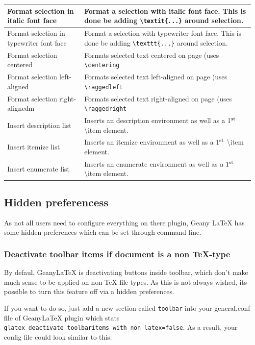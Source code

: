 \documentclass[%
a4paper,%
10pt,%
oneside,%
DIV18,
headsepline,
plainheadsepline,
footsepline,
plainfootsepline,
bibtotoc,%
liststotoc,%
BCOR12mm,%
halfparskip,%
openany,%
]{scrartcl}
\newcommand{\up}[1]{\ensuremath{^\textrm{\scriptsize#1}}}
\begin{document}
\begin{table}[H]
\begin{tabular}{l|p{9cm}}
Format selection in italic font face & Format a selection with italic font face.
This is done be adding \texttt{\textbackslash textit\{...\}} around selection.\\\hline
Format selection in typewriter font face & Format a selection with typewriter
font face. This is done be adding \texttt{\textbackslash texttt\{...\}} around
selection.\\\hline
Format selection centered & Formats selected text centered on page (uses \texttt{\textbackslash{}centering} \\\hline
Format selection left-aligned & Formats selected text left-aligned on page (uses \texttt{\textbackslash{}raggedleft} \\\hline
Format selection right-alignedm & Formats selected text right-aligned on page (uses \texttt{\textbackslash{}raggedright}\\\hline
Insert description list & Inserts an description environment as well as a 1\up{st} \textbackslash{}item element.\\\hline
Insert itemize list & Inserts an itemize environment as well as a 1\up{st} \textbackslash{}item element.\\\hline
Insert enumerate list & Inserts an enumerate environment as well as a 1\up{st} \textbackslash{}item element.\\\hline
\end{tabular}
\end{table}


\subsection{Hidden preferencess}
As not all users need to configure everything on there plugin, Geany
\LaTeX{} has some hidden preferences which can be set through
command line.

\subsubsection{Deactivate toolbar items if document is a non \TeX-type}

By defaul, Geany\LaTeX{} is deactivating buttons inside toolbar, which
don't make much sense to be applied on non-\TeX{} file types. As
this is not always wished, its possible to turn this feature off
via a hidden preferences.

If you want to do so, just add a new section called \texttt{toolbar}
into your general.conf file of Geany\LaTeX{} plugin which stats
\texttt{glatex\_deactivate\_toolbaritems\_with\_non\_latex=false}.
As a result, your config file could look similar to this:
\end{document}
